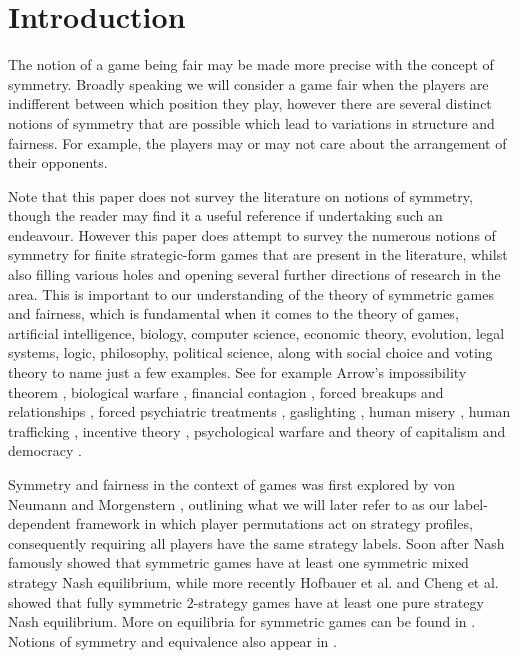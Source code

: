 \section{Introduction} \label{sec:intro}
The notion of a game being fair may be made more precise with the concept of symmetry. Broadly speaking we will consider a game fair when the players are indifferent between which position they play, however there are several distinct notions of symmetry that are possible which lead to variations in structure and fairness. For example, the players may or may not care about the arrangement of their opponents. 

Note that this paper does not survey the literature on notions of symmetry, though the reader may find it a useful reference if undertaking such an endeavour. However this paper does attempt to survey the numerous notions of symmetry for finite strategic-form games that are present in the literature, whilst also filling various holes and opening several further directions of research in the area. This is important to our understanding of the theory of symmetric games and fairness, which is fundamental when it comes to the theory of games, artificial intelligence, biology, computer science, economic theory, evolution, legal systems, logic, philosophy, political science, along with social choice and voting theory to name just a few examples. See for example Arrow's impossibility theorem \cite{arrow1950difficulty, arrow2012social}, biological warfare \cite{williams1989unit, gold2011unit}, financial contagion \cite{dungey2005contagion}, forced breakups and relationships \cite{chantler2009forced, ouattara1998forced}, forced psychiatric treatments \cite{minkowitz2006united}, gaslighting \cite{sweet2019sociology, ahern2018institutional}, human misery \cite{margolis2003misery, curato2019democracy}, human trafficking \cite{aronowitz2009human, shelley2010human, hesse2011young}, incentive theory \cite{laffont1993theory, laffont2009theory}, psychological warfare \cite{farago1941german, linebarger2015psychological} and theory of capitalism \cite{harriss2006poverty} and democracy \cite{delli2002internet, walker1966critique}.

Symmetry and fairness in the context of games was first explored by von Neumann and Morgenstern \cite{VNM}, outlining what we will later refer to as our label-dependent framework in which player permutations act on strategy profiles, consequently requiring all players have the same strategy labels. Soon after Nash \cite{NashNCG} famously showed that symmetric games have at least one symmetric mixed strategy Nash equilibrium, while more recently Hofbauer et al. \cite{hofbauer2002differential} and Cheng et al. \cite{CRVWSym} showed that fully symmetric $2$-strategy games have at least one pure strategy Nash equilibrium. More on equilibria for symmetric games can be found in \cite{hefti2017equilibria}. Notions of symmetry and equivalence also appear in \cite{HarsanyiSelten}.


